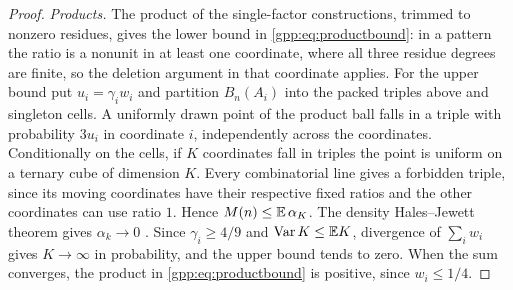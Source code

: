 \begin{proof}
\emph{Products.} The product of the single-factor constructions, trimmed to nonzero
residues, gives the lower bound in \eqref{gpp:eq:productbound}: in a pattern the ratio
is a nonunit in at least one coordinate, where all three residue degrees are finite, so
the deletion argument in that coordinate applies. For the upper bound put
$u_i=\gamma_iw_i$ and partition $B_n(A_i)$ into the packed triples above and singleton
cells. A uniformly drawn point of the product ball falls in a triple with probability
$3u_i$ in coordinate $i$, independently across the coordinates. Conditionally on the
cells, if $K$ coordinates fall in triples the point is uniform on a ternary cube of
dimension $K$. Every combinatorial line gives a forbidden triple, since its moving
coordinates have their respective fixed ratios and the other coordinates can use ratio
$1$. Hence $M(n)\le\mathbb{E}\,\alpha_K$. The density Hales--Jewett theorem gives
$\alpha_k\to0$ \cite{Polymath2012New}. Since $\gamma_i\ge4/9$ and
$\operatorname{Var} K\le\mathbb{E} K$, divergence of $\sum_iw_i$ gives $K\to\infty$ in probability, and
the upper bound tends to zero. When the sum converges, the product in
\eqref{gpp:eq:productbound} is positive, since $w_i\le1/4$.
\end{proof}


